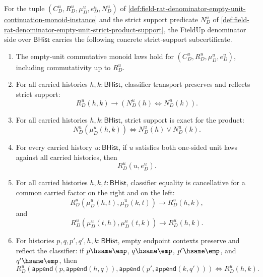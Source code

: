 \begin{theorem}
\label{thm:field-rat-denominator-empty-unit-strict-support-field-subcertificate}
For the tuple $(C_D^u,R_D^u,\mu_D^u,e_D^u,N_D^u)$ of
\autoref{def:field-rat-denominator-empty-unit-continuation-monoid-instance} and
the strict support predicate $N_D^u$ of
\autoref{def:field-rat-denominator-empty-unit-strict-product-support}, the
FieldUp denominator side over $\mathsf{BHist}$ carries the following concrete
strict-support subcertificate.
\begin{enumerate}
\item The empty-unit commutative monoid laws hold for
$(C_D^u,R_D^u,\mu_D^u,e_D^u)$, including commutativity up to $R_D^u$.

\item For all carried histories $h,k:\mathsf{BHist}$, classifier transport
preserves and reflects strict support:
$$
R_D^u(h,k)\to (N_D^u(h)\Longleftrightarrow N_D^u(k)).
$$

\item For all carried histories $h,k:\mathsf{BHist}$, strict support is exact
for the product:
$$
N_D^u(\mu_D^u(h,k))\Longleftrightarrow N_D^u(h)\lor N_D^u(k).
$$

\item For every carried history $u:\mathsf{BHist}$, if $u$ satisfies both
one-sided unit laws against all carried histories, then
$$
R_D^u(u,e_D^u).
$$

\item For all carried histories $h,k,t:\mathsf{BHist}$, classifier equality is
cancellative for a common carried factor on the right and on the left:
$$
R_D^u(\mu_D^u(h,t),\mu_D^u(k,t))\to R_D^u(h,k),
$$
and
$$
R_D^u(\mu_D^u(t,h),\mu_D^u(t,k))\to R_D^u(h,k).
$$

\item For histories $p,q,p',q',h,k:\mathsf{BHist}$, empty endpoint contexts
preserve and reflect the classifier:
if $p\hsame\emp$, $q\hsame\emp$, $p'\hsame\emp$, and $q'\hsame\emp$, then
$$
R_D^u(\mathsf{append}(p,\mathsf{append}(h,q)),
\mathsf{append}(p',\mathsf{append}(k,q')))
\Longleftrightarrow
R_D^u(h,k).
$$
\end{enumerate}
\end{theorem}
